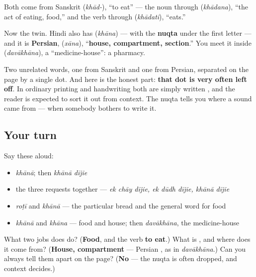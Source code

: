 \begin{cousinweb}
Both come from Sanskrit \textbf{} (\emph{khād-}), \textquotedblleft{}to eat\textquotedblright{} — the noun through \textbf{} (\emph{khādana}), \textquotedblleft{}the act of eating, food,\textquotedblright{} and the verb through \textbf{} (\emph{khādati}), \textquotedblleft{}eats.\textquotedblright{}

Now the twin. Hindi also has \textbf{} (\emph{khāna}) — with the \textbf{nuqta} under the first letter — and it is \textbf{Persian}, \textbf{} (\emph{xāna}), \textquotedblleft{}\textbf{house, compartment, section}.\textquotedblright{} You meet it inside \textbf{} (\emph{davākhāna}), a \textquotedblleft{}medicine-house\textquotedblright{}: a pharmacy.

Two unrelated words, one from Sanskrit and one from Persian, separated on the page by a single dot. And here is the honest part: \textbf{that dot is very often left off}. In ordinary printing and handwriting both are simply written \textbf{}, and the reader is expected to sort it out from context. The nuqta tells you where a sound came from — when somebody bothers to write it.
\end{cousinweb}

\subsection*{Your turn}
Say these aloud:

\begin{itemize}
\raggedright
  \item \emph{khānā}; then \emph{khānā dījie}
  \item the three requests together — \emph{ek chāy dījie, ek dūdh dījie, khānā dījie}
  \item \emph{roṭī} and \emph{khānā} — the particular bread and the general word for food
  \item \emph{khānā} and \emph{khāna} — food and house; then \emph{davākhāna}, the medicine-house
\end{itemize}

\begin{tcolorbox}[breakable,colback=teal!4,colframe=teal!35!black,title={Before you move on}]
What two jobs does \textbf{} do? (\textbf{Food}, and the verb \textbf{to eat}.) What is \textbf{}, and where does it come from? (\textbf{House, compartment} — Persian \textbf{}, as in \emph{davākhāna}.) Can you always tell them apart on the page? (\textbf{No} — the nuqta is often dropped, and context decides.)
\end{tcolorbox}
